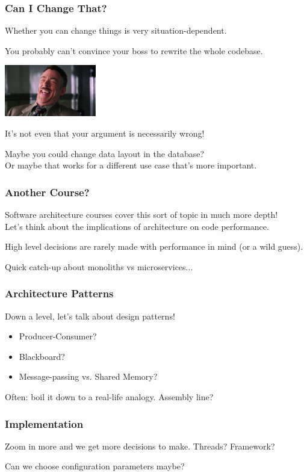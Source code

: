 \begin{frame}
\frametitle{Can I Change That?}
Whether you can change things is very situation-dependent. 

You probably can't convince your boss to rewrite the whole codebase.
\begin{center}
	\includegraphics[width=0.3\textwidth]{images/jjj.jpg}
\end{center}

It's not even that your argument is necessarily wrong!

Maybe you could change data layout in the database?\\
\quad Or maybe that works for a different use case that's more important.

\end{frame}

\begin{frame}
\frametitle{Another Course?}
Software architecture courses cover this sort of topic in much more depth!\\
\quad Let's think about the implications of architecture on code performance.

High level decisions are rarely made with performance in mind (or a wild guess).

Quick catch-up about monoliths vs microservices...

\end{frame}

\begin{frame}
\frametitle{Architecture Patterns}
Down a level, let's talk about design patterns!

\begin{itemize}
	\item Producer-Consumer?
	\item Blackboard?
	\item Message-passing vs. Shared Memory?
\end{itemize}

Often: boil it down to a real-life analogy. Assembly line?

\end{frame}

\begin{frame}
\frametitle{Implementation}
Zoom in more and we get more decisions to make. Threads? Framework?

Can we choose configuration parameters maybe?

\end{frame}

